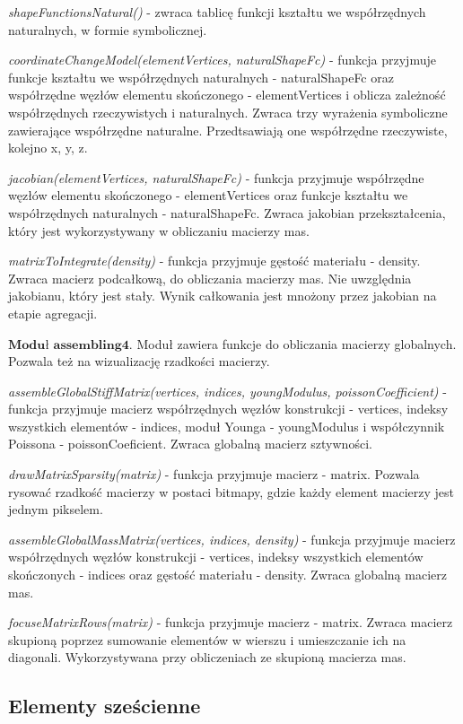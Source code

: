 \textit{shapeFunctionsNatural()} - zwraca tablicę funkcji kształtu we współrzędnych naturalnych, w formie symbolicznej.

\textit{coordinateChangeModel(elementVertices, naturalShapeFc)} - funkcja przyjmuje funkcje kształtu we współrzędnych naturalnych - naturalShapeFc  oraz współrzędne węzłów elementu skończonego - elementVertices i oblicza zależność współrzędnych rzeczywistych i naturalnych. Zwraca trzy wyrażenia symboliczne zawierające współrzędne naturalne. Przedtsawiają one współrzędne rzeczywiste, kolejno x, y, z.

\textit{jacobian(elementVertices, naturalShapeFc)} - funkcja przyjmuje współrzędne węzłów elementu skończonego - elementVertices oraz funkcje kształtu we współrzędnych naturalnych - naturalShapeFc. Zwraca jakobian przekształcenia, który jest wykorzystywany w obliczaniu macierzy mas.

\textit{matrixToIntegrate(density)} - funkcja przyjmuje gęstość materiału - density. Zwraca macierz podcałkową, do obliczania macierzy mas. Nie uwzględnia jakobianu, który jest stały. Wynik całkowania jest mnożony przez jakobian na etapie agregacji.

 \( \textbf{Moduł assembling4} \).
Moduł zawiera funkcje do obliczania macierzy globalnych. Pozwala też na wizualizację rzadkości macierzy.

\textit{assembleGlobalStiffMatrix(vertices, indices, youngModulus, poissonCoefficient)} - funkcja przyjmuje macierz współrzędnych węzłów konstrukcji - vertices, indeksy wszystkich elementów - indices, moduł Younga - youngModulus i współczynnik Poissona - poissonCoeficient. Zwraca globalną macierz sztywności.

\textit{drawMatrixSparsity(matrix)} - funkcja przyjmuje macierz - matrix. Pozwala rysować rzadkość macierzy w postaci bitmapy, gdzie każdy element macierzy jest jednym pikselem.

\textit{assembleGlobalMassMatrix(vertices, indices, density)} - funkcja przyjmuje macierz współrzędnych węzłów konstrukcji - vertices, indeksy wszystkich elementów skończonych - indices oraz gęstość materiału - density. Zwraca globalną macierz mas.

\textit{focuseMatrixRows(matrix)} - funkcja przyjmuje macierz - matrix. Zwraca macierz skupioną poprzez sumowanie elementów w wierszu i umieszczanie ich na diagonali. Wykorzystywana przy obliczeniach ze skupioną macierza mas.

\subsection{Elementy sześcienne}
\label{cha:elementy szescienne}


